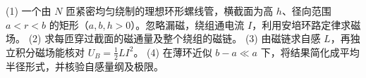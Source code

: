 (1) 一个由 \(N\) 匝紧密均匀绕制的理想环形螺线管，横截面为高 \(h\)、径向范围 \(a<r<b\) 的矩形（\(a,b,h>0\)）。忽略漏磁，绕组通电流 \(I\)，利用安培环路定律求磁场。
(2) 求每匝穿过截面的磁通量及整个绕组的磁链。
(3) 由磁链求自感 \(L\)，再独立积分磁场能核对 \(U_B=\frac12LI^2\)。
(4) 在薄环近似 \(b-a\ll a\) 下，将结果简化成平均半径形式，并核验自感量纲及极限。
